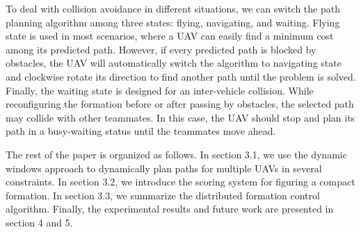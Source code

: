 To deal with collision avoidance in different situations, we can switch the path planning algorithm among three states: flying, navigating, and waiting. Flying state is used in most scenarios, where a UAV can easily find a minimum cost among its predicted path. However, if every predicted path is blocked by obstacles, the UAV will automatically switch the algorithm to navigating state and clockwise rotate its direction to find another path until the problem is solved. Finally, the waiting state is designed for an inter-vehicle collision. While reconfiguring the formation before or after passing by obstacles, the selected path may collide with other teammates. In this case, the UAV should stop and plan its path in a busy-waiting status until the teammates move ahead.

The rest of the paper is organized as follows. In section 3.1, we use the dynamic windows approach \citep{580977} to dynamically plan paths for multiple UAVs in several constraints. In section 3.2, we introduce the scoring system for figuring a compact formation. In section 3.3, we summarize the distributed formation control algorithm. Finally, the experimental results and future work are presented in section 4 and 5.
